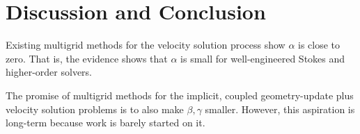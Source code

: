 \documentclass[twocolumn,letterpaper]{igs}
\begin{document}
\section{Discussion and Conclusion}

Existing multigrid methods for the velocity solution process show $\alpha$ is close to zero.  That is, the evidence shows that $\alpha$ is small for well-engineered Stokes \citep{IsaacStadlerGhattas2015} and higher-order \citep{BrownSmithAhmadia2013} solvers.

The promise of multigrid methods for the implicit, coupled geometry-update plus velocity solution problems is to also make $\beta,\gamma$ smaller.  However, this aspiration is long-term because work is barely started on it.



\end{document}
